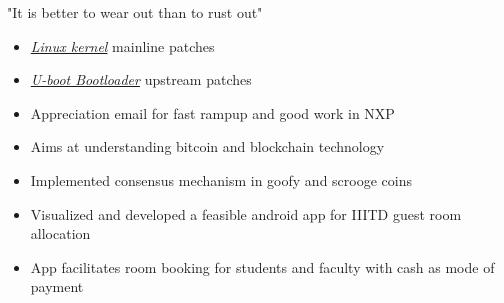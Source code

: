 
"It is better to wear out than to rust out"

\begin{itemize}
    \item \href{https://patchwork.ozlabs.org/project/linux-mtd/list/?submitter=76041&archive=both&series=&q=&delegate=&state=*}{\textit{Linux kernel}} mainline patches
    \smallskip
    \item \href{https://patchwork.ozlabs.org/project/uboot/list/?submitter=76041&state=\%2A&series=&q=&delegate=&archive=both}{\textit{U-boot Bootloader}} upstream patches
    \smallskip
    \item Appreciation email for fast rampup and good work in NXP
\end{itemize}








\begin{itemize}
\item Aims at understanding bitcoin and blockchain technology
\item Implemented consensus mechanism in goofy and scrooge coins
\end{itemize}
\smallskip

\begin{itemize}
\item Visualized and developed a feasible android app for IIITD guest room allocation
\item App facilitates room booking for students and faculty with cash as mode of payment
\end{itemize}
\smallskip

